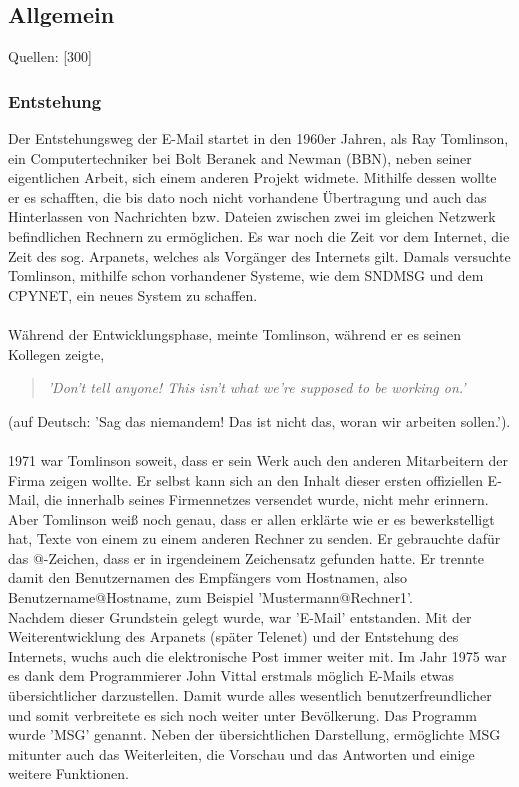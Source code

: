 \documentclass[12pt,a4paper]{report}
\begin{document}
\begin{onehalfspace}
\section{Allgemein}
\begin{flushright}
\begin{tiny}
Quellen: [300]
\end{tiny}
\end{flushright}
\subsubsection{Entstehung}\label{sssec:Entstehung}
Der Entstehungsweg der E-Mail startet in den 1960er Jahren, als Ray Tomlinson, ein Computertechniker bei Bolt Beranek and Newman (BBN), neben seiner eigentlichen Arbeit, sich einem anderen Projekt widmete. Mithilfe dessen wollte er es schafften, die bis dato noch nicht vorhandene Übertragung und auch das Hinterlassen von Nachrichten bzw. Dateien zwischen zwei im gleichen Netzwerk befindlichen Rechnern zu ermöglichen. Es war noch die Zeit vor dem Internet, die Zeit des sog. Arpanets, welches als Vorgänger des Internets gilt. Damals versuchte Tomlinson, mithilfe schon vorhandener Systeme, wie dem SNDMSG und dem CPYNET, ein neues System zu schaffen.\\\\

Während der Entwicklungsphase, meinte Tomlinson, während er es seinen Kollegen zeigte, 
\begin{quote}
\textit{'Don't tell anyone! This isn't what we're supposed to be working on.'}
\end{quote}
(auf Deutsch: 'Sag das niemandem! Das ist nicht das, woran wir arbeiten sollen.').\\\\

1971 war Tomlinson soweit, dass er sein Werk auch den anderen Mitarbeitern der Firma zeigen wollte. Er selbst kann sich an den Inhalt dieser ersten offiziellen E-Mail, die innerhalb seines Firmennetzes versendet wurde, nicht mehr erinnern. Aber Tomlinson weiß noch genau, dass er allen erklärte wie er es bewerkstelligt hat, Texte von einem zu einem anderen Rechner zu senden. Er gebrauchte dafür das @-Zeichen, dass er in irgendeinem Zeichensatz gefunden hatte. Er trennte damit den Benutzernamen des Empfängers vom Hostnamen, also Benutzername@Hostname, zum Beispiel 'Mustermann@Rechner1'. \\

Nachdem dieser Grundstein gelegt wurde, war 'E-Mail' entstanden. Mit der Weiterentwicklung des Arpanets (später Telenet) und der Entstehung des Internets, wuchs auch die elektronische Post immer weiter mit. Im Jahr 1975 war es dank dem Programmierer John Vittal erstmals möglich E-Mails etwas übersichtlicher darzustellen. Damit wurde alles wesentlich benutzerfreundlicher und somit verbreitete es sich noch weiter unter Bevölkerung. Das Programm wurde 'MSG' genannt. Neben der übersichtlichen Darstellung, ermöglichte MSG mitunter auch das Weiterleiten, die Vorschau und das Antworten und einige weitere Funktionen.\\


\end{onehalfspace}
\end{document}
